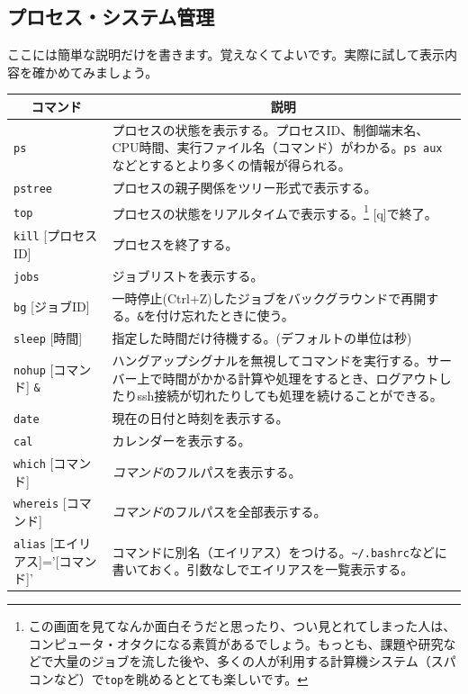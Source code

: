 \documentclass[a4j]{ltjsreport}
\begin{document}
    \subsection{プロセス・システム管理}
    ここには簡単な説明だけを書きます。覚えなくてよいです。実際に試して表示内容を確かめてみましょう。
    \begin{longtable}[c]{|p{3.5cm}|p{13.5cm}|}
        \hline
        \multicolumn{1}{|c|}{\textbf{コマンド}}&\multicolumn{1}{|c|}{\textbf{説明}}\\
        \hline\hline
        \texttt{ps}&プロセスの状態を表示する。プロセスID、制御端末名、CPU時間、実行ファイル名（コマンド）がわかる。\texttt{ps aux}などとするとより多くの情報が得られる。\\
        \hline
        \texttt{pstree}&プロセスの親子関係をツリー形式で表示する。\\
        \hline
        \texttt{top} &プロセスの状態をリアルタイムで表示する。\footnote{この画面を見てなんか面白そうだと思ったり、つい見とれてしまった人は、コンピュータ・オタクになる素質があるでしょう。もっとも、課題や研究などで大量のジョブを流した後や、多くの人が利用する計算機システム（スパコンなど）で\texttt{top}を眺めるととても楽しいです。} [q]で終了。\\
        \hline
        \texttt{kill} [プロセスID]&プロセスを終了する。\\
        \hline
        \texttt{jobs} &ジョブリストを表示する。\\
        \hline
        \texttt{bg} [ジョブID]&一時停止(Ctrl+Z)したジョブをバックグラウンドで再開する。\texttt{\&}を付け忘れたときに使う。 \\
        \hline
        \texttt{sleep} [時間]&指定した時間だけ待機する。(デフォルトの単位は秒)\\
        \hline
        \texttt{nohup} [コマンド] \texttt{\&} &ハングアップシグナルを無視してコマンドを実行する。サーバー上で時間がかかる計算や処理をするとき、ログアウトしたりssh接続が切れたりしても処理を続けることができる。\\
        \hline
        \texttt{date} &現在の日付と時刻を表示する。\\
        \hline
        \texttt{cal} &カレンダーを表示する。\\
        \hline
        \texttt{which} [コマンド] &\emph{コマンド}のフルパスを表示する。\\
        \hline
        \texttt{whereis} [コマンド] &\emph{コマンド}のフルパスを全部表示する。\\
        \hline
        \texttt{alias} {\small [エイリアス]='[コマンド]'} &コマンドに別名（エイリアス）をつける。\verb|~/.bashrc|などに書いておく。引数なしでエイリアスを一覧表示する。\\

\end{longtable}
\end{document}
